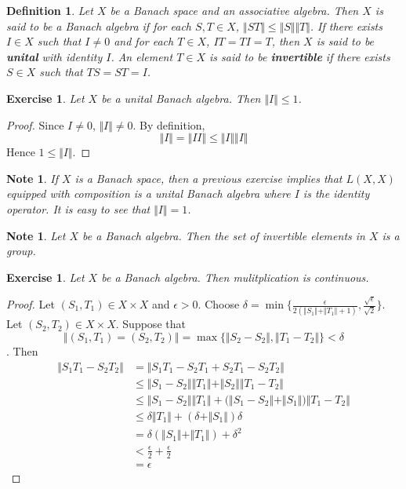 \documentclass[12pt]{amsart}
\newtheorem{defn}[thm]{Definition}
\newtheorem{note}[thm]{Note}
\newtheorem{ex}[thm]{Exercise}
\newcommand{\del}{\delta}
\newcommand{\ep}{\epsilon}
\newcommand{\n}{\Vert}
\begin{document}
\begin{defn}
Let $X$ be a Banach space and an associative algebra. Then $X$ is said to be a Banach algebra if for each $S,T \in X$, $\n ST \n \leq \n S \n \n T \n$. If there exists $I \in X$ such that $I \neq 0$ and for each $T \in X$, $IT = TI = T$, then $X$ is said to be \textbf{unital} with identity $I$. An element $T \in X$ is said to be \textbf{invertible} if there exists $S \in X$ such that $TS=ST = I$.
\end{defn}

\begin{ex}
Let $X$ be a unital Banach algebra. Then $\n I \n \leq 1$. 
\end{ex}

\begin{proof}
Since $I \neq 0$, $\n I \n \neq 0$. By definition, $$\n I \n = \n I I \n \leq \n I \n \n I \n $$ Hence $1 \leq \n I \n $.
\end{proof}

\begin{note}
If $X$ is a Banach space, then a previous exercise implies that $L(X,X)$ equipped with composition is a unital Banach algebra where $I$ is the identity operator. It is easy to see that $\n I \n =1$.
\end{note}

\begin{note}
Let $X$ be a  Banach algebra. Then the set of invertible elements in $X$ is a group.  
\end{note}

\begin{ex}
Let $X$ be a Banach algebra. Then mulitplication is continuous. 
\end{ex}

\begin{proof}
Let $(S_1,T_1) \in X \times X$ and $\ep > 0$. Choose $\del = \min\{\frac{\ep}{2(\n S_1 \n + \n T_1 \n +1)}, \frac{\sqrt{\ep}}{\sqrt{2}}\}$. Let $(S_2, T_2) \in X \times X$. Suppose that $$\n (S_1, T_1) = (S_2, T_2) \n = \max \{ \n S_2 -S_2 \n , \n T_1 - T_2 \n\} < \del$$. Then 
\begin{align*}
\n S_1T_1 - S_2T_2 \n 
&= \n S_1T_1 - S_2T_1 +S_2T_1 - S_2T_2 \n \\
& \leq \n S_1 -S_2 \n \n T_1 \n + \n S_2 \n \n T_1 - T_2 \n \\
& \leq \n S_1 -S_2 \n \n T_1 \n + \big( \n S_1-S_2 \n + \n S_1 \n\big) \n T_1 - T_2 \n\\
& \leq \del \n T_1 \n +(\del + \n S_1 \n) \del \\
&= \del (\n S_1 \n + \n T_1 \n) + \del^2 \\
& < \frac{\ep}{2} + \frac{\ep}{2}\\
&= \ep
\end{align*}
\end{proof}
\end{document}
